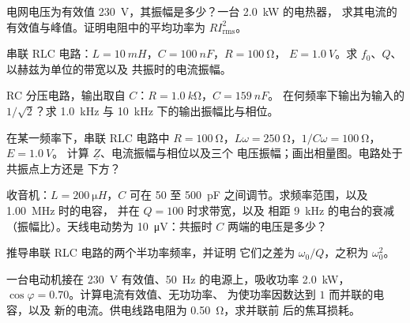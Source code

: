 \begin{exercise}[$\star$]\label{exo:b1:sinusoidal-impedance:3}
电网电压为有效值 \qty{230}{V}，其振幅是多少？一台 \qty{2.0}{kW} 的电热器，
求其电流的有效值与峰值。证明电阻中的平均功率为
$RI_{\mathrm{rms}}^2$。
\end{exercise}

\begin{exercise}[$\star$]\label{exo:b1:sinusoidal-impedance:4}
串联 RLC 电路：$L = \qty{10}{mH}$，$C = \qty{100}{nF}$，$R = \qty{100}{\ohm}$，
$E = \qty{1.0}{V}$。求 $f_0$、$Q$、以赫兹为单位的带宽以及
共振时的电流振幅。
\end{exercise}

\begin{exercise}[$\star\star$]\label{exo:b1:sinusoidal-impedance:5}
RC 分压电路，输出取自 $C$：$R = \qty{1.0}{k\ohm}$，$C = \qty{159}{nF}$。
在何频率下输出为输入的 $1/\sqrt2$？求
\qty{1.0}{kHz} 与 \qty{10}{kHz} 下的输出振幅比与相位。
\end{exercise}

\begin{exercise}[$\star\star$]\label{exo:b1:sinusoidal-impedance:6}
在某一频率下，串联 RLC 电路中 $R = \qty{100}{\ohm}$，$L\omega =
\qty{250}{\ohm}$，$1/C\omega = \qty{100}{\ohm}$，$E = \qty{1.0}{V}$。
计算 $\underline Z$、电流振幅与相位以及三个
电压振幅；画出相量图。电路处于共振点上方还是
下方？
\end{exercise}

\begin{exercise}[$\star\star$]\label{exo:b1:sinusoidal-impedance:7}
收音机：$L = \qty{200}{\micro H}$，$C$ 可在 \qty{50}{} 至
\qty{500}{pF} 之间调节。求频率范围，以及 \qty{1.00}{MHz} 时的电容，
并在 $Q = 100$ 时求带宽，以及
相距 \qty{9}{kHz} 的电台的衰减（振幅比）。天线电动势为
\qty{10}{\micro V}：共振时 $C$ 两端的电压是多少？
\end{exercise}

\begin{exercise}[$\star\star$]\label{exo:b1:sinusoidal-impedance:8}
推导串联 RLC 电路的两个半功率频率，并证明
它们之差为 $\omega_0/Q$，之积为 $\omega_0^2$。
\end{exercise}

\begin{exercise}[$\star\star$]\label{exo:b1:sinusoidal-impedance:9}
一台电动机接在 \qty{230}{V} 有效值、\qty{50}{Hz} 的电源上，吸收功率 \qty{2.0}{kW}，
$\cos\varphi = 0.70$。计算电流有效值、无功功率、
为使功率因数达到 $1$ 而并联的电容，以及
新的电流。供电线路电阻为 \qty{0.50}{\ohm}，求并联前
后的焦耳损耗。
\end{exercise}

